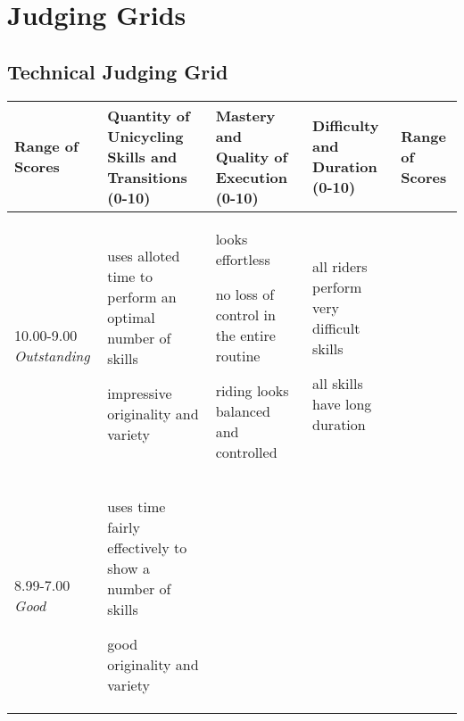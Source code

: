 \chapter{Judging Grids}
\section{Technical Judging Grid}
\begin{minipage}{\textwidth}
\begingroup
    \fontsize{7pt}{9pt}\selectfont
\setlength{\LTleft}{-2.5cm}
\begin{longtable}{|p{1.5cm}|p{5cm}|p{5cm}|p{5cm}|p{1.5cm}|}
\hline
\textbf{Range of Scores} &
\textbf{Quantity of Unicycling Skills and \newline Transitions (0-10)} &
\textbf{Mastery and Quality of Execution \newline (0-10)} &
\textbf{Difficulty and Duration \newline (0-10)} &
\textbf{Range of Scores} \\
\hline
10.00-9.00 \newline
\emph{Outstanding} &

\begin{judging_items}%
\item uses alloted time to perform an optimal number of skills
\item impressive originality and variety
\end{judging_items} &

\begin{judging_items}%
\item looks effortless
\item no loss of control in the entire routine
\item riding looks balanced and controlled
\end{judging_items} &

\begin{judging_items}%
\item all riders perform very difficult skills
\item all skills have long duration
\end{judging_items} \\
\hline

8.99-7.00 \newline
\emph{Good} &

\begin{judging_items}%
\item uses time fairly effectively to show a number of skills
\item good originality and variety
\end{judging_items} &


\end{longtable}
\end{minipage}

